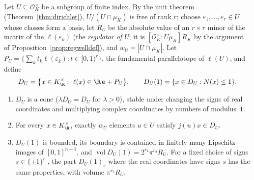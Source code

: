Let $U\subseteq\mathcal O_K^\times$ be a subgroup of finite index. By the unit theorem (Theorem~\ref{thm:dirichlet}), $U/(U\cap\mu_K)$
is free of rank $r$; choose $\varepsilon_1,\dots,\varepsilon_r\in U$ whose classes form a basis, let $R_U$ be the absolute value of
an $r\times r$ minor of the matrix of the $\ell(\varepsilon_k)$ (the \emph{regulator of $U$}; it is $[\mathcal O_K^\times:U\mu_K]R_K$
by the argument of Proposition~\ref{prop:regwelldef}), and $w_U=|U\cap\mu_K|$. Let $P_U=\{\sum_kt_k\ell(\varepsilon_k):t\in[0,1)^r\}$,
the fundamental parallelotope of $\ell(U)$, and define
\[
D_U=\bigl\{x\in K_\R^\times:\ \ell(x)\in\R\,\mathbf e+P_U\bigr\},\qquad D_U(1)=\{x\in D_U:N(x)\le1\}.
\]

\begin{lemma}\label{lem:cone}
\begin{enumerate}[label=(\alph*)]
\item $D_U$ is a cone ($\lambda D_U=D_U$ for $\lambda>0$), stable under changing the signs of real coordinates and multiplying complex
coordinates by numbers of modulus~$1$.
\item For every $x\in K_\R^\times$, exactly $w_U$ elements $u\in U$ satisfy $j(u)x\in D_U$.
\item $D_U(1)$ is bounded, its boundary is contained in finitely many Lipschitz images of $[0,1]^{n-1}$, and
$\operatorname{vol}D_U(1)=2^{r_1}\pi^{r_2}R_U$. For a fixed choice of signs $s\in\{\pm1\}^{r_1}$, the part $D_U(1)_s$ where the real
coordinates have signs $s$ has the same properties, with volume $\pi^{r_2}R_U$.
\end{enumerate}
\end{lemma}
